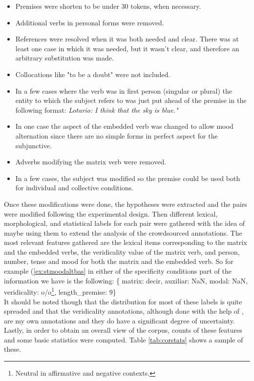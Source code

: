     \begin{itemize}
    \item Premises were shorten to be under 30 tokens, when necessary.
    \item Additional verbs in personal forms were removed.
    \item References were resolved when it was both needed and clear. There was at least one case in which it was needed, but it wasn't clear, and therefore an arbitrary substitution was made.
    \item Collocations like "to be a doubt" were not included.
    \item In a few cases where the verb was in first person (singular or plural) the entity to which the subject refers to was just put ahead of the premise in the following format: \textit{Lotario: I think that the sky is blue."}
    \item In one case the aspect of the embedded verb was changed to allow mood alternation since there are no simple forms in perfect aspect for the subjunctive.
    \item Adverbs modifying the matrix verb were removed.
    \item In a few cases, the subject was modified so the premise could be used both for individual and collective conditions.
  \end{itemize}

Once these modifications were done, the hypotheses were extracted and the pairs were modified following the experimental design. Then different lexical, morphological, and statistical labels for each pair were gathered with the idea of maybe using them to extend the analysis of the crowdsourced annotations. The most relevant features gathered are the lexical items corresponding to the matrix and the embedded verbs, the veridicality value of the matrix verb, and person, number, tense and mood for both the matrix and the embedded verb. So for example (\ref{ex:stmoodaltbas} in either of the specificity conditions part of the information we have is the following: \{ matrix: decir, auxiliar: NaN, modal: NaN, veridicality: o/o\footnote{Neutral in affirmative and negative contexts.}, length\_premise: $9$\}\\

It should be noted though that the distribution for most of these labels is quite spreaded and that the veridicality annotations, although done with the help of \citet{stanlex2012}, are my own annotations and they do have a significant degree of uncertainty. Lastly, in order to obtain an overall view of the corpus, counts of these features and some basic statistics were computed. Table \ref{tab:corstats} shows a sample of these.\\

